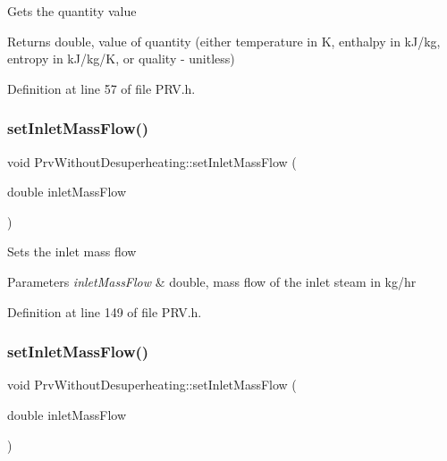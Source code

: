 Gets the quantity value

\begin{DoxyReturn}{Returns}
double, value of quantity (either temperature in K, enthalpy in k\+J/kg, entropy in k\+J/kg/K, or quality -\/ unitless) 
\end{DoxyReturn}


Definition at line 57 of file P\+R\+V.\+h.

\mbox{\label{class_prv_without_desuperheating_abeccff2dc91144452b34ca343ee63fa7}} 
\subsubsection{\texorpdfstring{set\+Inlet\+Mass\+Flow()}{setInletMassFlow()}\hspace{0.1cm}{\footnotesize\ttfamily [1/3]}}
{\footnotesize\ttfamily void Prv\+Without\+Desuperheating\+::set\+Inlet\+Mass\+Flow (\begin{DoxyParamCaption}\item[{double}]{inlet\+Mass\+Flow }\end{DoxyParamCaption})\hspace{0.3cm}{\ttfamily [inline]}}

Sets the inlet mass flow


\begin{DoxyParams}{Parameters}
{\em inlet\+Mass\+Flow} & double, mass flow of the inlet steam in kg/hr \\
\hline
\end{DoxyParams}


Definition at line 149 of file P\+R\+V.\+h.

\mbox{\label{class_prv_without_desuperheating_abeccff2dc91144452b34ca343ee63fa7}} 
\subsubsection{\texorpdfstring{set\+Inlet\+Mass\+Flow()}{setInletMassFlow()}\hspace{0.1cm}{\footnotesize\ttfamily [2/3]}}
{\footnotesize\ttfamily void Prv\+Without\+Desuperheating\+::set\+Inlet\+Mass\+Flow (\begin{DoxyParamCaption}\item[{double}]{inlet\+Mass\+Flow }\end{DoxyParamCaption})\hspace{0.3cm}{\ttfamily [inline]}}

